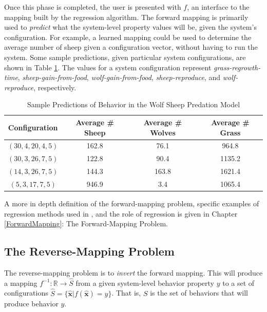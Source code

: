 Once this phase is completed, the user is presented with $f$, an interface to the mapping built by the regression algorithm.
The forward mapping is primarily used to \textit{predict} what the system-level property values will be, given the system's configuration.
For example, a learned mapping could be used to determine the average number of sheep given a configuration vector, without having to run the system.
Some sample predictions, given particular system configurations, are shown in Table \ref{table:ws_predictions}.
The values for a system configuration represent \textit{grass-regrowth-time}, \textit{sheep-gain-from-food}, \textit{wolf-gain-from-food}, \textit{sheep-reproduce}, and \textit{wolf-reproduce}, respectively.

\begin{table}[ht]
  \caption{Sample Predictions of Behavior in the Wolf Sheep Predation Model}
  \centering
  \begin{tabular}{c c c c}
    \hline \hline
    Configuration & Average \# Sheep & Average \# Wolves & Average \# Grass \\
    \hline
    $(30, 4, 20, 4, 5)$ & 162.8 & 76.1 & 964.8 \\
    $(30, 3, 26, 7, 5)$ & 122.8 & 90.4 & 1135.2 \\
    $(14, 3, 26, 7, 5)$ & 144.3 & 163.8 & 1621.4 \\
    $(5, 3, 17, 7, 5)$ & 946.9 & 3.4 & 1065.4 \\
    \hline
  \end{tabular}
  \label{table:ws_predictions}
\end{table}


A more in depth definition of the forward-mapping problem, specific examples of regression methods used in \fw, and the role of regression is given in Chapter \ref{ForwardMapping}: The Forward-Mapping Problem.


\subsection{The Reverse-Mapping Problem}

The reverse-mapping problem is to \textit{invert} the forward mapping.
This will produce a mapping $ f^{-1}: \mathbb{R} \rightarrow \hat S$ from a given system-level behavior property $y$ to a set of
configurations $ \hat S = \{ \mathbf {\hat x} | f( \mathbf {\hat x}) = y \}$.
That is, $S$ is the set of behaviors that will produce behavior $y$.

